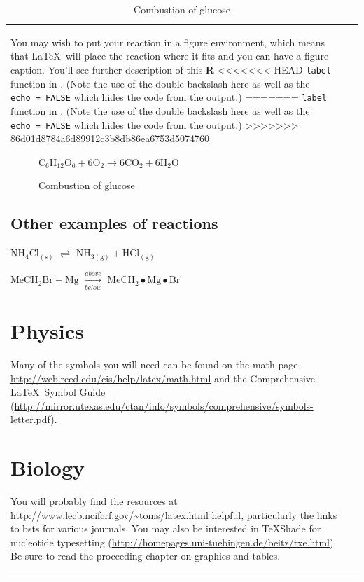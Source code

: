 \documentclass[12pt,twoside]{reedthesis}
\begin{document}
\begin{longtable}[c]{@{}lr@{}}
  You may wish to put your reaction in a figure environment, which means
  that \LaTeX~will place the reaction where it fits and you can have a
  figure caption. You'll see further description of this \textbf{R}
<<<<<<< HEAD
  \texttt{label} function in \protect\hyperlink{refux5flabels}{}. (Note
  the use of the double backslash here as well as the
  \texttt{echo\ =\ FALSE} which hides the code from the output.)
=======
  \texttt{label} function in \protect\hyperlink{ref_labels}{}. (Note the
  use of the double backslash here as well as the \texttt{echo\ =\ FALSE}
  which hides the code from the output.)
>>>>>>> 86d01d8784a6d89912c3b8db86ea6753d5074760
  
  \begin{figure}[h!tbp]
  \begin{center}
  $\mathrm{C_6H_{12}O_6  + 6O_2} \longrightarrow \mathrm{6CO_2 + 6H_2O}$
  \caption{Combustion of glucose}
  \label{fig:comb-gluc}
  \end{center}
  \end{figure}
  
  \subsection{Other examples of
  reactions}\label{other-examples-of-reactions}
  
  \(\mathrm{NH_4Cl_{(s)}}\) \(\rightleftharpoons\)
  \(\mathrm{NH_{3(g)}+HCl_{(g)}}\)
  
  \noindent \(\mathrm{MeCH_2Br + Mg}\) \(\xrightarrow[below]{above}\)
  \(\mathrm{MeCH_2\bullet Mg \bullet Br}\)
  
  \section{Physics}\label{physics}
  
  Many of the symbols you will need can be found on the math page
  \url{http://web.reed.edu/cis/help/latex/math.html} and the Comprehensive
  \LaTeX~Symbol Guide
  (\url{http://mirror.utexas.edu/ctan/info/symbols/comprehensive/symbols-letter.pdf}).
  
  \section{Biology}\label{biology}
  
  You will probably find the resources at
  \url{http://www.lecb.ncifcrf.gov/~toms/latex.html} helpful, particularly
  the links to bsts for various journals. You may also be interested in
  TeXShade for nucleotide typesetting
  (\url{http://homepages.uni-tuebingen.de/beitz/txe.html}). Be sure to
  read the proceeding chapter on graphics and tables.
  

\end{longtable}
\end{document}
